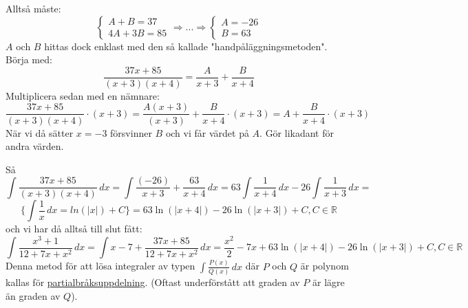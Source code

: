 Alltså måste:
\begin{equation*}
    \left\lbrace
    \begin{matrix}
        A+B=37 \\
        4A+3B=85
    \end{matrix}
    \right.
    \Rightarrow...\Rightarrow
    \left\lbrace
    \begin{matrix}
        A=-26 \\
        B=63
    \end{matrix}
    \right.
\end{equation*}
$A$ och $B$ hittas dock enklast med den så kallade "handpåläggningsmetoden".
Börja med:
\begin{equation*}
    \frac{37x+85}{(x+3)(x+4)}=\frac{A}{x+3}+\frac{B}{x+4}
\end{equation*}
Multiplicera sedan med en nämnare:
\begin{equation*}
    \frac{37x+85}{(x+3)(x+4)}\cdot(x+3)=
    \frac{A(x+3)}{(x+3)}+\frac{B}{x+4}\cdot(x+3)=
    A+\frac{B}{x+4}\cdot(x+3)
\end{equation*}
När vi då sätter $x=-3$ försvinner $B$ och vi får värdet på $A$.
Gör likadant för andra värden.

Så
\begin{equation*}
    \int\frac{37x+85}{(x+3)(x+4)}\, dx=
    \int\frac{(-26)}{x+3}+\frac{63}{x+4}\, dx=
    63\int\frac{1}{x+4}\, dx -26\int\frac{1}{x+3}\, dx=
\end{equation*}
\begin{equation*}
    \{\int\frac{1}{x}\, dx=ln(|x|)+C\}=
    63\ln(|x+4|)-26\ln(|x+3|)+C,C\in\mathbb{R}
\end{equation*}
och vi har då alltså till slut fått:
\begin{equation*}
    \int\frac{x^3+1}{12+7x+x^2}\, dx=
    \int x-7+\frac{37x+85}{12+7x+x^2}\, dx=
    \frac{x^2}{2}-7x+63\ln(|x+4|)-26\ln(|x+3|)+C,C\in\mathbb{R}
\end{equation*}
Denna metod för att lösa integraler av typen $\int\frac{P(x)}{Q(x)}\, dx$ där $P$ och $Q$ är polynom kallas för \underline{partialbråksuppdelning}.
(Oftast underförstått att graden av $P$ är lägre än graden av $Q$).

